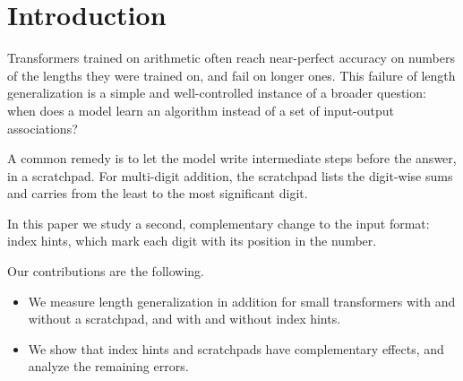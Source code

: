 \section{Introduction}

Transformers trained on arithmetic often reach near-perfect accuracy on numbers of the lengths they were trained on, and fail on longer ones. This failure of length generalization is a simple and well-controlled instance of a broader question: when does a model learn an algorithm instead of a set of input-output associations?

A common remedy is to let the model write intermediate steps before the answer, in a scratchpad. For multi-digit addition, the scratchpad lists the digit-wise sums and carries from the least to the most significant digit.

In this paper we study a second, complementary change to the input format: index hints, which mark each digit with its position in the number.

Our contributions are the following.
\begin{itemize}
  \item We measure length generalization in addition for small transformers with and without a scratchpad, and with and without index hints.
  \item We show that index hints and scratchpads have complementary effects, and analyze the remaining errors.
\end{itemize}
